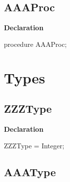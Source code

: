 \documentclass{report}
\newif\ifpdf
\begin{document}
\subsection*{AAAProc}
\fi
\label{ok_sorting-AAAProc}
\begin{list}{}{
\setlength{\itemindent}{0cm}
\setlength{\listparindent}{0cm}
\setlength{\leftmargin}{\evensidemargin}
\addtolength{\leftmargin}{\tmplength}
\settowidth{\labelsep}{X}
\addtolength{\leftmargin}{\labelsep}
\setlength{\labelwidth}{\tmplength}
}
\item[\textbf{Declaration}\hfill]
\ifpdf
\begin{flushleft}
\fi
\begin{ttfamily}
procedure AAAProc;\end{ttfamily}

\ifpdf
\end{flushleft}
\fi

\end{list}
\section{Types}
\ifpdf
\subsection*{\large{\textbf{ZZZType}}\normalsize\hspace{1ex}\hrulefill}
\else
\subsection*{ZZZType}
\fi
\label{ok_sorting-ZZZType}
\begin{list}{}{
\setlength{\itemindent}{0cm}
\setlength{\listparindent}{0cm}
\setlength{\leftmargin}{\evensidemargin}
\addtolength{\leftmargin}{\tmplength}
\settowidth{\labelsep}{X}
\addtolength{\leftmargin}{\labelsep}
\setlength{\labelwidth}{\tmplength}
}
\item[\textbf{Declaration}\hfill]
\ifpdf
\begin{flushleft}
\fi
\begin{ttfamily}
ZZZType = Integer;\end{ttfamily}

\ifpdf
\end{flushleft}
\fi

\end{list}
\ifpdf
\subsection*{\large{\textbf{AAAType}}\normalsize\hspace{1ex}\hrulefill}
\else
\end{document}
